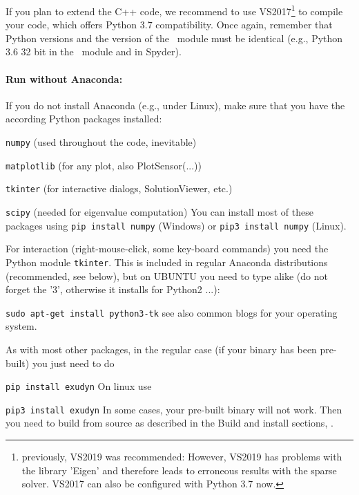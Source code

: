 \ei
If you plan to extend the C++ code, we recommend to use VS2017\footnote{previously, VS2019 was recommended: However, VS2019 has problems with the library 'Eigen' and therefore leads to erroneous results with the sparse solver. VS2017 can also be configured with Python 3.7 now.} to compile your code, which offers Python 3.7 compatibility.
Once again, remember that Python versions and the version of the \codeName\ module must be identical (e.g., Python 3.6 32 bit  in the \codeName\ module and in Spyder).

\paragraph{Run without Anaconda:}
If you do not install Anaconda (e.g., under Linux), make sure that you have the according Python packages installed:
\bi
  \item \texttt{numpy} (used throughout the code, inevitable)
  \item \texttt{matplotlib} (for any plot, also PlotSensor(...))
  \item \texttt{tkinter} (for interactive dialogs, SolutionViewer, etc.)
  \item \texttt{scipy} (needed for eigenvalue computation)
\ei
You can install most of these packages using \texttt{pip install numpy} (Windows) or \texttt{pip3 install numpy} (Linux).

For interaction (right-mouse-click, some key-board commands) you need the Python module \texttt{tkinter}. This is included in regular Anaconda distributions (recommended, see below), but on UBUNTU you need to type alike (do not forget the '3', otherwise it installs for Python2 ...):
\bi
  \item[] \texttt{sudo apt-get install python3-tk}
\ei
see also common blogs for your operating system.

As with most other packages, in the regular case (if your binary has been pre-built) you just need to do
\bi
  \item \texttt{pip install exudyn}
\ei
On linux use 
\bi
  \item \texttt{pip3 install exudyn}
\ei
In some cases, your pre-built binary will not work. Then you need to build from source as described in the Build and install sections, .

